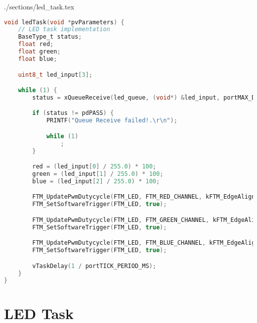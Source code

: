 \begin{filecontents}[overwrite]{./sections/led_task.tex}
\begin{lstlisting}[language=c,caption=LED Task, label=list:led]
void ledTask(void *pvParameters) {
    // LED task implementation
    BaseType_t status;
    float red;
    float green;
    float blue;

    uint8_t led_input[3];

    while (1) {
        status = xQueueReceive(led_queue, (void*) &led_input, portMAX_DELAY);

        if (status != pdPASS) {
            PRINTF("Queue Receive failed!.\r\n");

            while (1)
                ;
        }

        red = (led_input[0] / 255.0) * 100;
        green = (led_input[1] / 255.0) * 100;
        blue = (led_input[2] / 255.0) * 100;

        FTM_UpdatePwmDutycycle(FTM_LED, FTM_RED_CHANNEL, kFTM_EdgeAlignedPwm, (uint8_t) red);
        FTM_SetSoftwareTrigger(FTM_LED, true);

        FTM_UpdatePwmDutycycle(FTM_LED, FTM_GREEN_CHANNEL, kFTM_EdgeAlignedPwm, (uint8_t) green);
        FTM_SetSoftwareTrigger(FTM_LED, true);

        FTM_UpdatePwmDutycycle(FTM_LED, FTM_BLUE_CHANNEL, kFTM_EdgeAlignedPwm, (uint8_t) blue);
        FTM_SetSoftwareTrigger(FTM_LED, true);

        vTaskDelay(1 / portTICK_PERIOD_MS);
    }
}
\end{lstlisting}
\end{filecontents}

\section*{LED Task}

